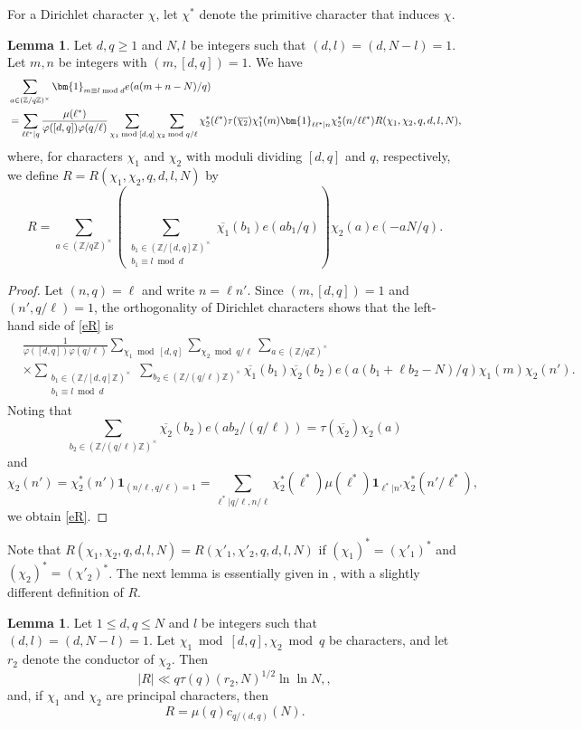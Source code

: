 \documentclass{amsart}
\theoremstyle{definition}
\newtheorem{lem}[dfn]{Lemma}
\theoremstyle{remark}
\newcommand{\1}{
    \bm{1}
}
\newcommand{\pZ}[1]{
(\mathbb{Z}/{ #1 \mathbb{Z}})^{\times}
}
\begin{document}
For a Dirichlet character $\chi$, let $\chi^*$ denote the primitive character that induces $\chi$. 
\begin{lem}\label{sumA}
Let $d,q \geq 1$ and $N,l$ be integers such that $(d,l)=(d,N-l)=1$. Let $m,n$ be integers with $(m,[d,q])=1$. We have
\begin{align}
&\sum_{a \in \pZ{q}} \1_{m \equiv l \bmod d} e(a(m+n-N)/q) \notag \\
&= \sum_{\ell \ell^*|q} \frac{\mu(\ell^*)}{\varphi([d,q])\varphi(q/\ell)} \sum_{\chi_1 \bmod [d,q]} \sum_{\chi_2 \bmod q/\ell} \chi^*_2(\ell^*) \tau(\overline{\chi_2}) \chi^*_1(m) \1_{\ell \ell^*|n} \chi^*_2(n/\ell \ell^*) R(\chi_1,\chi_2,q,d,l,N), \label{eR}
\end{align}
where, for characters $\chi_1$ and $\chi_2$ with moduli dividing $[d,q]$ and $q$, respectively, we define $R=R(\chi_1,\chi_2,q,d,l,N)$ by
\[ R = \sum_{a \in \pZ{q}} \left( \sum_{\substack{b_1 \in \pZ{[d,q]} \\ b_1 \equiv l \bmod d}} \overline{\chi_1}(b_1) e(ab_1/q) \right) \chi_2(a) e(-aN/q). \] 
\end{lem}

\begin{proof}
Let $(n,q)=\ell$ and write $n=\ell n'$. Since $(m,[d,q])=1$ and $(n',q/\ell)=1$, the orthogonality of Dirichlet characters shows that the left-hand side of \eqref{eR} is
\begin{align*}
&\frac{1}{\varphi([d,q])\varphi(q/\ell)} \sum_{\chi_1 \bmod [d,q]} \sum_{\chi_2 \bmod q/\ell} \sum_{a \in \pZ{q}} \\
& \times \sum_{\substack{b_1 \in \pZ{[d,q]} \\ b_1 \equiv l \bmod d}} \sum_{b_2 \in \pZ{(q/\ell)}} \overline{\chi_1}(b_1) \overline{\chi_2}(b_2) e(a(b_1+\ell b_2-N)/q) \chi_1(m) \chi_2(n'). 
\end{align*}
Noting that
\[ \sum_{b_2 \in \pZ{(q/\ell)}} \overline{\chi_2}(b_2) e(ab_2/(q/\ell)) = \tau(\overline{\chi_2}) \chi_2(a) \]
and
\[ \chi_2(n') = \chi^*_2(n') \1_{(n/\ell,q/\ell)=1} = \sum_{\ell^*|q/\ell,n/\ell} \chi^*_2(\ell^*) \mu(\ell^*) \1_{\ell^*|n'} \chi^*_2(n'/\ell^*), \]
we obtain \eqref{eR}. 
\end{proof}

Note that $R(\chi_1,\chi_2,q,d,l,N)=R(\chi'_1,\chi'_2,q,d,l,N)$ if $(\chi_1)^*=(\chi'_1)^*$ and $(\chi_2)^*=(\chi'_2)^*$. 
The next lemma is essentially given in \cite{maier1990unusually}, with a slightly different definition of $R$. 
\begin{lem}\label{R}
Let $1 \leq d,q \leq N$ and $l$ be integers such that $(d,l)=(d,N-l)=1$. Let $\chi_1 \bmod [d,q], \chi_2 \bmod q$ be characters, and let $r_2$ denote the conductor of $\chi_2$. Then
\begin{equation} |R| \ll q \tau(q) (r_2,N)^{1/2} \ln{\ln{N}}, \label{R_bound}, \end{equation}
and, if $\chi_1$ and $\chi_2$ are principal characters, then
\begin{equation} R = \mu(q) c_{q/(d,q)}(N). \label{R_0} \end{equation}
\end{lem}
\end{document}
